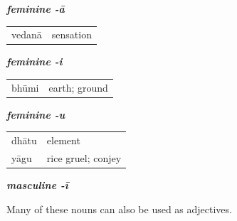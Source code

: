 \documentclass[11pt,oneside]{memoir}
\begin{document}
\bigskip

\begin{multicols}{3}

{\centering\textit{\textbf{feminine -ā}}\par}

\begin{center}
\begin{tabular}{ll}
vedanā & sensation\\
\end{tabular}
\end{center}

\columnbreak
{\centering\textit{\textbf{feminine -i}}\par}

\begin{center}
\begin{tabular}{ll}
bhūmi & earth; ground\\
\end{tabular}
\end{center}

\columnbreak
{\centering\textit{\textbf{feminine -u}}\par}

\begin{center}
\begin{tabular}{ll}
dhātu & element\\
yāgu & rice gruel; conjey\\
\end{tabular}
\end{center}

\end{multicols}

\clearpage

{\centering\textit{\textbf{masculine -ī}}\par}

Many of these nouns can also be used as adjectives.
\end{document}
